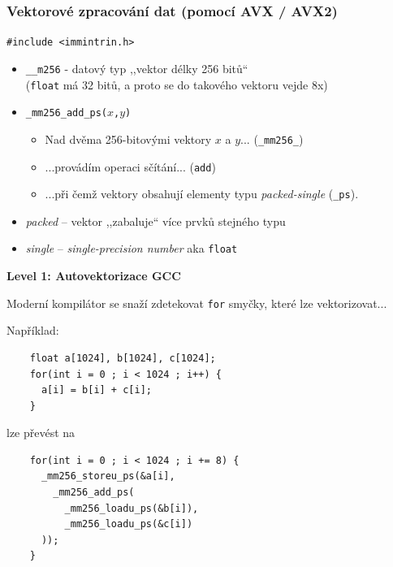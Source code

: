 \documentclass[usenames,dvipsnames,9pt]{beamer}
\begin{document}
\begin{frame}
  \frametitle{Vektorové zpracování dat (pomocí AVX / AVX2)}

  \hfill \texttt{\#include <immintrin.h>}
  \vspace{1em}

  \begin{itemize}
    \item {\large \texttt{\_\_m256} - datový typ ,,vektor délky 256 bitů``} \\
          \hspace{30pt}(\texttt{float} má 32 bitů, a proto se do takového vektoru vejde 8x)
    \pause
    \item {\large \texttt{\_mm256\_add\_ps($x$,$y$)}}
          \begin{itemize}
            \item Nad dvěma 256-bitovými vektory $x$ a $y$... (\texttt{\_mm256\_})
            \item ...provádím operaci sčítání... (\texttt{add})
            \item ...při čemž vektory obsahují elementy typu \emph{packed-single} (\texttt{\_ps}).
          \end{itemize}
    \pause
    \vspace{1em}
    \item \emph{packed} -- vektor ,,zabaluje`` více prvků stejného typu
    \item \emph{single} -- \emph{single-precision number} aka \texttt{float}
  \end{itemize}
\end{frame}

\begin{frame}[fragile]
  \begin{center}
    \LARGE\bf Level 1: Autovektorizace GCC \hspace{10pt} 
  \end{center}
\end{frame}

\begin{frame}[fragile]
  Moderní kompilátor se snaží zdetekovat \texttt{for} smyčky, které lze vektorizovat...

  Například:

  \begin{verbatim}
    float a[1024], b[1024], c[1024];
    for(int i = 0 ; i < 1024 ; i++) {
      a[i] = b[i] + c[i];
    }
  \end{verbatim}

  lze převést na

  \begin{verbatim}
    for(int i = 0 ; i < 1024 ; i += 8) {
      _mm256_storeu_ps(&a[i],
        _mm256_add_ps(
          _mm256_loadu_ps(&b[i]),
          _mm256_loadu_ps(&c[i])
      ));
    }
  \end{verbatim}
\end{frame}
\end{document}
